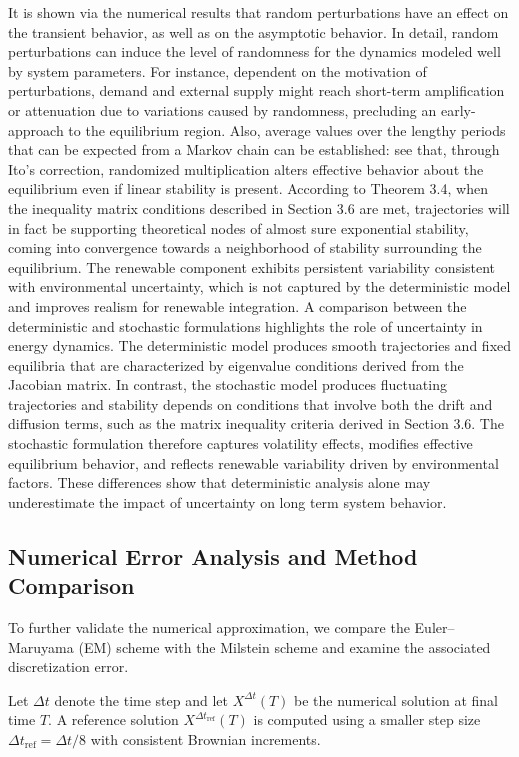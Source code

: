\documentclass[11pt]{article}
\numberwithin{equation}{section}
\begin{document}
It is shown via the numerical results that random perturbations have an effect on the transient behavior, as well as on the asymptotic behavior. In detail, random perturbations can induce the level of randomness for the dynamics modeled well by system parameters. For instance, dependent on the motivation of perturbations, demand and external supply might reach short-term amplification or attenuation due to variations caused by randomness, precluding an early-approach to the equilibrium region. Also, average values over the lengthy periods that can be expected from a Markov chain can be established: see that, through Ito's correction, randomized multiplication alters effective behavior about the equilibrium even if linear stability is present. According to Theorem 3.4, when the inequality matrix conditions described in Section 3.6 are met, trajectories will in fact be supporting theoretical nodes of almost sure exponential stability, coming into convergence towards a neighborhood of stability surrounding the equilibrium. The renewable component exhibits persistent variability consistent with environmental uncertainty, which is not captured by the deterministic model and improves realism for renewable integration.
A comparison between the deterministic and stochastic formulations highlights the role of uncertainty in energy dynamics. The deterministic model produces smooth trajectories and fixed equilibria that are characterized by eigenvalue conditions derived from the Jacobian matrix. In contrast, the stochastic model produces fluctuating trajectories and stability depends on conditions that involve both the drift and diffusion terms, such as the matrix inequality criteria derived in Section 3.6. The stochastic formulation therefore captures volatility effects, modifies effective equilibrium behavior, and reflects renewable variability driven by environmental factors. These differences show that deterministic analysis alone may underestimate the impact of uncertainty on long term system behavior.

\subsection{Numerical Error Analysis and Method Comparison}

To further validate the numerical approximation, we compare the Euler--Maruyama (EM) scheme with the Milstein scheme and examine the associated discretization error.

Let $\Delta t$ denote the time step and let $X^{\Delta t}(T)$ be the numerical solution at final time $T$. A reference solution $X^{\Delta t_{\mathrm{ref}}}(T)$ is computed using a smaller step size $\Delta t_{\mathrm{ref}} = \Delta t/8$ with consistent Brownian increments.
\end{document}
